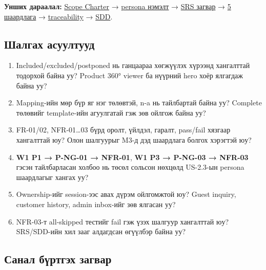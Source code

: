 \documentclass[
  11pt,
  a4paper,
]{article}
\providecommand{\tightlist}{%
  \setlength{\itemsep}{0pt}\setlength{\parskip}{0pt}}
\begin{document}
\textbf{Унших дараалал:}
\href{../../requirements/scope-charter.md}{Scope Charter} →
\href{wiki/persona-and-pivot.md}{persona нэмэлт} →
\href{../../requirements/srs-template.md}{SRS загвар} →
\href{../../requirements/requirements.md}{5 шаардлага} →
\href{../../requirements/traceability-matrix.md}{traceability} →
\href{../../architecture/sdd-template.md}{SDD}.

\subsection{Шалгах
асуултууд}\label{doc7-ux448ux430ux43bux433ux430ux445-ux430ux441ux443ux443ux43bux442ux443ux443ux434}

\begin{enumerate}
\def\labelenumi{\arabic{enumi}.}
\tightlist
\item
  Included/excluded/postponed нь ганцаараа хөгжүүлэх хүрээнд хангалттай
  тодорхой байна уу? Product 360° viewer ба нүүрний hero хоёр ялгагдаж
  байна уу?
\item
  Mapping-ийн мөр бүр яг нэг төлөвтэй, n-a нь тайлбартай байна уу?
  Complete төлөвийг template-ийн агуулгатай гэж зөв ойлгож байна уу?
\item
  FR-01/02, NFR-01\ldots03 бүрд оролт, үйлдэл, гаралт, pass/fail хязгаар
  хангалттай юу? Олон шалгуурыг M3-д дэд шаардлага болгох хэрэгтэй юу?
\item
  \textbf{W1 P1 → P-NG-01 → NFR-01}, \textbf{W1 P3 → P-NG-03 → NFR-03}
  гэсэн тайлбарласан холбоо нь төсөл сольсон нөхцөлд US-2.3-ын persona
  шаардлагыг хангах уу?
\item
  Ownership-ийг session-ээс авах дүрэм ойлгомжтой юу? Guest inquiry,
  customer history, admin inbox-ийг зөв ялгасан уу?
\item
  NFR-03-т all-skipped тестийг fail гэж үзэх шалгуур хангалттай юу?
  SRS/SDD-ийн хил зааг алдагдсан өгүүлбэр байна уу?
\end{enumerate}

\subsection{Санал бүртгэх
загвар}\label{doc7-ux441ux430ux43dux430ux43b-ux431ux4afux440ux442ux433ux44dux445-ux437ux430ux433ux432ux430ux440}
\end{document}
